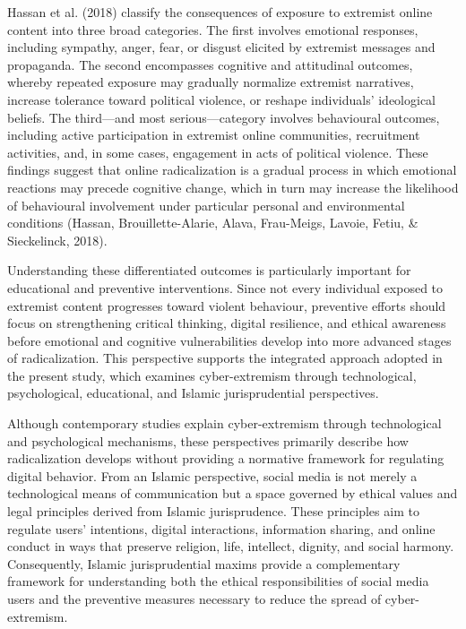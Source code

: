 \documentclass[10pt]{NSP1}
\begin{document}
Hassan et al. (2018) classify the consequences of exposure to extremist online content into three broad categories. The first involves emotional responses, including sympathy, anger, fear, or disgust elicited by extremist messages and propaganda. The second encompasses cognitive and attitudinal outcomes, whereby repeated exposure may gradually normalize extremist narratives, increase tolerance toward political violence, or reshape individuals' ideological beliefs. The third—and most serious—category involves behavioural outcomes, including active participation in extremist online communities, recruitment activities, and, in some cases, engagement in acts of political violence. These findings suggest that online radicalization is a gradual process in which emotional reactions may precede cognitive change, which in turn may increase the likelihood of behavioural involvement under particular personal and environmental conditions (Hassan, Brouillette-Alarie, Alava, Frau-Meigs, Lavoie, Fetiu, \& Sieckelinck, 2018).

Understanding these differentiated outcomes is particularly important for educational and preventive interventions. Since not every individual exposed to extremist content progresses toward violent behaviour, preventive efforts should focus on strengthening critical thinking, digital resilience, and ethical awareness before emotional and cognitive vulnerabilities develop into more advanced stages of radicalization. This perspective supports the integrated approach adopted in the present study, which examines cyber-extremism through technological, psychological, educational, and Islamic jurisprudential perspectives.

\par\medskip{}\smallskip

Although contemporary studies explain cyber-extremism through technological and psychological mechanisms, these perspectives primarily describe how radicalization develops without providing a normative framework for regulating digital behavior. From an Islamic perspective, social media is not merely a technological means of communication but a space governed by ethical values and legal principles derived from Islamic jurisprudence. These principles aim to regulate users' intentions, digital interactions, information sharing, and online conduct in ways that preserve religion, life, intellect, dignity, and social harmony. Consequently, Islamic jurisprudential maxims provide a complementary framework for understanding both the ethical responsibilities of social media users and the preventive measures necessary to reduce the spread of cyber-extremism.
\end{document}
